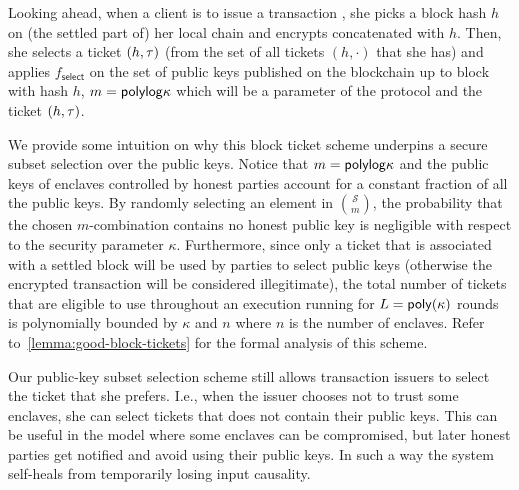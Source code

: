 Looking ahead, when a client is to issue a transaction \tx, she picks a block hash $h$ on (the settled part of) her local chain \chainLocal and encrypts \tx concatenated with $h$.
%
Then, she selects a ticket $(h, \mathsf{\tau})$ (from the set of all tickets $(h, \cdot)$ that she has) and applies $f_{\mathsf{select}}$ on the set of public keys published on the blockchain up to block with hash $h$, $m = \mathsf{polylog} \kappa$ which will be a parameter of the protocol and the ticket $(h, \mathsf{\tau})$.

We provide some intuition on why this block ticket scheme underpins a secure subset selection over the public keys.
%
Notice that $m = \mathsf{polylog} \kappa$ and the public keys of enclaves controlled by honest parties account for a constant fraction of all the public keys.
%
By randomly selecting an element in $\binom{\mathcal{S}}{m}$, the probability that the chosen $m$-combination contains no honest public key is negligible with respect to the security parameter $\kappa$.
%
Furthermore, since only a ticket that is associated with a settled block will be used by parties to select public keys (otherwise the encrypted transaction will be considered illegitimate), the total number of tickets that are eligible to use throughout an execution running for $L = \mathsf{poly}(\kappa)$ rounds is polynomially bounded by $\kappa$ and $n$ where $n$ is the number of enclaves.
%
Refer to~\cref{lemma:good-block-tickets} for the formal analysis of this scheme.

\begin{remark}
	Our public-key subset selection scheme still allows transaction issuers to select the ticket that she prefers.
	I.e., when the issuer chooses not to trust some enclaves, she can select tickets that does not contain their public keys.
	This can be useful in the model where some enclaves can be compromised, but later honest parties get notified and avoid using their public keys.
	In such a way the system self-heals from temporarily losing input causality.
\end{remark}

